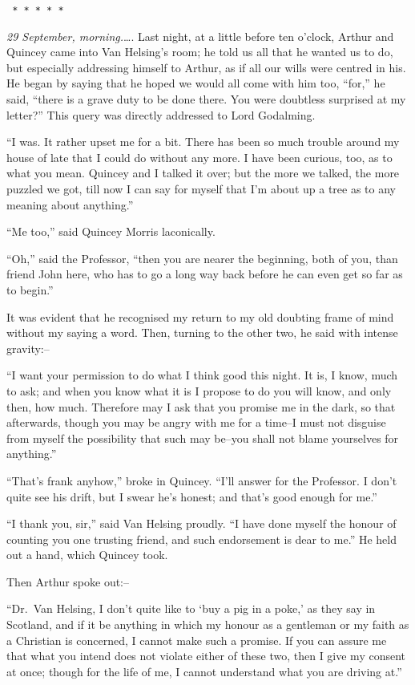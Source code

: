 \documentclass[12pt,openright]{book}
\begin{document}
\texttt{   *       *       *       *       *}

\textit{29 September, morning.}…. Last night, at a little before ten o’clock, Arthur and Quincey came into Van Helsing’s room; he told us all that he wanted us to do, but especially addressing himself to Arthur, as if all our wills were centred in his. He began by saying that he hoped we would all come with him too, “for,” he said, “there is a grave duty to be done there. You were doubtless surprised at my letter?” This query was directly addressed to Lord Godalming.

“I was. It rather upset me for a bit. There has been so much trouble around my house of late that I could do without any more. I have been curious, too, as to what you mean. Quincey and I talked it over; but the more we talked, the more puzzled we got, till now I can say for myself that I’m about up a tree as to any meaning about anything.”

“Me too,” said Quincey Morris laconically.

“Oh,” said the Professor, “then you are nearer the beginning, both of you, than friend John here, who has to go a long way back before he can even get so far as to begin.”

It was evident that he recognised my return to my old doubting frame of mind without my saying a word. Then, turning to the other two, he said with intense gravity:–

“I want your permission to do what I think good this night. It is, I know, much to ask; and when you know what it is I propose to do you will know, and only then, how much. Therefore may I ask that you promise me in the dark, so that afterwards, though you may be angry with me for a time–I must not disguise from myself the possibility that such may be–you shall not blame yourselves for anything.”

“That’s frank anyhow,” broke in Quincey. “I’ll answer for the Professor. I don’t quite see his drift, but I swear he’s honest; and that’s good enough for me.”

“I thank you, sir,” said Van Helsing proudly. “I have done myself the honour of counting you one trusting friend, and such endorsement is dear to me.” He held out a hand, which Quincey took.

Then Arthur spoke out:–

“Dr. Van Helsing, I don’t quite like to ‘buy a pig in a poke,’ as they say in Scotland, and if it be anything in which my honour as a gentleman or my faith as a Christian is concerned, I cannot make such a promise. If you can assure me that what you intend does not violate either of these two, then I give my consent at once; though for the life of me, I cannot understand what you are driving at.”
\end{document}
